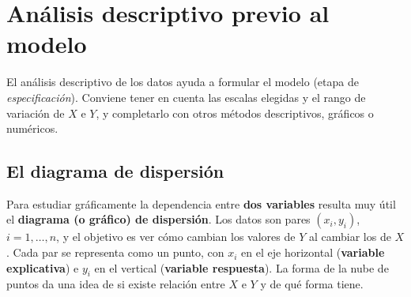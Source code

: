 \section{Análisis descriptivo previo al modelo}
\label{sec:t1-descriptivo}

El análisis descriptivo de los datos ayuda a formular el modelo (etapa de
\emph{especificación}). Conviene tener en cuenta las escalas elegidas y el rango de variación de
$X$ e $Y$, y completarlo con otros métodos descriptivos, gráficos o numéricos.

\subsection{El diagrama de dispersión}

Para estudiar gráficamente la dependencia entre \textbf{dos variables} resulta muy útil el
\textbf{diagrama (o gráfico) de dispersión}. Los datos son pares $(x_i,y_i)$, $i=1,\ldots,n$, y
el objetivo es ver cómo cambian los valores de $Y$ al cambiar los de $X$. Cada par se
representa como un punto, con $x_i$ en el eje horizontal (\textbf{variable explicativa}) e
$y_i$ en el vertical (\textbf{variable respuesta}). La forma de la nube de puntos da una idea
de si existe relación entre $X$ e $Y$ y de qué forma tiene.

